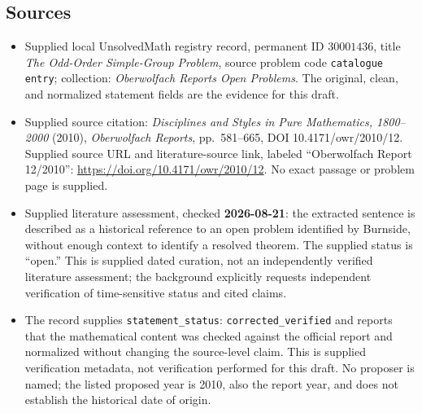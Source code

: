 \documentclass[11pt]{article}
\begin{document}
\subsection{Sources}
\begin{itemize}
\item Supplied local UnsolvedMath registry record, permanent ID \(30001436\), title \emph{The Odd-Order Simple-Group Problem}, source problem code \texttt{catalogue entry}; collection: \emph{Oberwolfach Reports Open Problems}. The original, clean, and normalized statement fields are the evidence for this draft.
\item Supplied source citation: \emph{Disciplines and Styles in Pure Mathematics, 1800--2000} (2010), \emph{Oberwolfach Reports}, pp.\ 581--665, DOI 10.4171/owr/2010/12. Supplied source URL and literature-source link, labeled ``Oberwolfach Report 12/2010'': \url{https://doi.org/10.4171/owr/2010/12}. No exact passage or problem page is supplied.
\item Supplied literature assessment, checked \textbf{2026-08-21}: the extracted sentence is described as a historical reference to an open problem identified by Burnside, without enough context to identify a resolved theorem. The supplied status is ``open.'' This is supplied dated curation, not an independently verified literature assessment; the background explicitly requests independent verification of time-sensitive status and cited claims.
\item The record supplies \texttt{statement\_status}: \texttt{corrected\_verified} and reports that the mathematical content was checked against the official report and normalized without changing the source-level claim. This is supplied verification metadata, not verification performed for this draft. No proposer is named; the listed proposed year is 2010, also the report year, and does not establish the historical date of origin.
\end{itemize}
\end{document}
